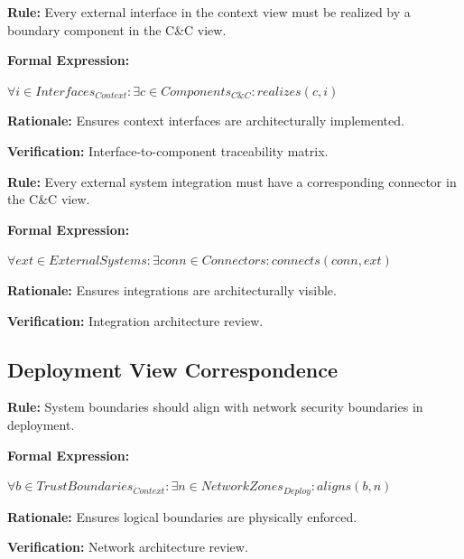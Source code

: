 \documentclass[11pt,letterpaper]{article}
\begin{document}
\begin{definitionbox}
\textbf{Rule:} Every external interface in the context view must be realized by a boundary component in the C\&C view.

\textbf{Formal Expression:}
\begin{center}
$\forall i \in Interfaces_{Context} : \exists c \in Components_{C\&C} : realizes(c, i)$
\end{center}

\textbf{Rationale:} Ensures context interfaces are architecturally implemented.

\textbf{Verification:} Interface-to-component traceability matrix.
\end{definitionbox}

\begin{definitionbox}
\textbf{Rule:} Every external system integration must have a corresponding connector in the C\&C view.

\textbf{Formal Expression:}
\begin{center}
$\forall ext \in ExternalSystems : \exists conn \in Connectors : connects(conn, ext)$
\end{center}

\textbf{Rationale:} Ensures integrations are architecturally visible.

\textbf{Verification:} Integration architecture review.
\end{definitionbox}

\subsection{Deployment View Correspondence}

\begin{definitionbox}
\textbf{Rule:} System boundaries should align with network security boundaries in deployment.

\textbf{Formal Expression:}
\begin{center}
$\forall b \in TrustBoundaries_{Context} : \exists n \in NetworkZones_{Deploy} : aligns(b, n)$
\end{center}

\textbf{Rationale:} Ensures logical boundaries are physically enforced.

\textbf{Verification:} Network architecture review.
\end{definitionbox}
\end{document}
